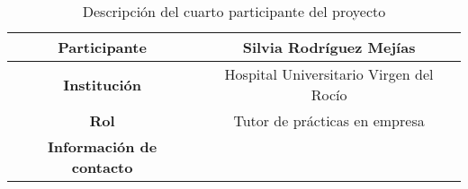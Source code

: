\begin{table}[H]
    \centering
    \begin{tabular}{|c|c|}
    \hline
    \textbf{Participante} & Silvia Rodríguez Mejías \\
    \hline
    \textbf{Institución} & Hospital Universitario Virgen del Rocío \\
    \hline
    \textbf{Rol} & Tutor de prácticas en empresa \\
    \hline
    \textbf{Información de contacto} & \\
    \hline
    \end{tabular}
\caption{Descripción del cuarto participante del proyecto}
\label{tab:cuartoParticipante}
\end{table}